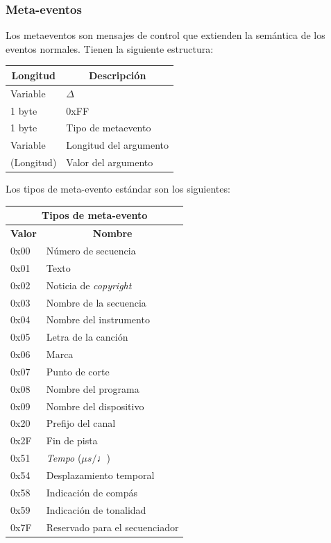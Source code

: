 \subsubsection{Meta-eventos}

Los metaeventos son mensajes de control que extienden la semántica de los eventos normales. Tienen la siguiente estructura:

\begin{center}
	\begin{tabular}{|l|l|}
		\hline \multicolumn{1}{|c|}{\textbf{Longitud}} & \multicolumn{1}{c|}{\textbf{Descripción}} \\
		\hline Variable & $\Delta$ \\ 
		\hline 1 byte & 0xFF \\
		\hline 1 byte & Tipo de metaevento \\
		\hline Variable & Longitud del argumento \\ 
		\hline (Longitud) & Valor del argumento \\ 
		\hline
	\end{tabular} 
\end{center}

Los tipos de meta-evento estándar son los siguientes:

\begin{center}
	\begin{tabular}{|l|l|}
		\hline \multicolumn{2}{|c|}{\textbf{Tipos de meta-evento}} \\
		\hline \multicolumn{1}{|c|}{\textbf{Valor}} & \multicolumn{1}{c|}{\textbf{Nombre}} \\
		\hline 0x00 & Número de secuencia \\
		\hline 0x01 & Texto \\
		\hline 0x02 & Noticia de \textit{copyright} \\
		\hline 0x03 & Nombre de la secuencia \\
		\hline 0x04 & Nombre del instrumento \\
		\hline 0x05 & Letra de la canción \\
		\hline 0x06 & Marca \\
		\hline 0x07 & Punto de corte \\
		\hline 0x08 & Nombre del programa \\
		\hline 0x09 & Nombre del dispositivo \\
		\hline 0x20 & Prefijo del canal \\
		\hline 0x2F & Fin de pista \\
		\hline 0x51 & \textit{Tempo} ($\mu s/\quarternote$) \\
		\hline 0x54 & Desplazamiento temporal \\
		\hline 0x58 & Indicación de compás \\
		\hline 0x59 & Indicación de tonalidad \\
		\hline 0x7F & Reservado para el secuenciador \\
		\hline 
	\end{tabular} 
\end{center}

